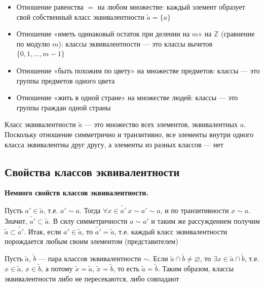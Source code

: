 \documentclass[a4paper,12pt]{article}
\theoremstyle{definition}
\theoremstyle{plain}
\theoremstyle{remark}
\begin{document}
	\begin{tcolorbox}[colback=gray!5, colframe=gray!50, title=Примеры отношений эквивалентности]
		\begin{itemize}
			\item Отношение равенства $=$ на любом множестве: каждый элемент образует свой собственный класс эквивалентности $\widetilde{a} = \{a\}$
			\item Отношение «иметь одинаковый остаток при делении на $m$» на $\mathbb{Z}$ (сравнение по модулю $m$): классы эквивалентности — это классы вычетов $\{0, 1, \dots, m-1\}$
			\item Отношение «быть похожим по цвету» на множестве предметов: классы — это группы предметов одного цвета
			\item Отношение «жить в одной стране» на множестве людей: классы — это группы граждан одной страны
		\end{itemize}
	\end{tcolorbox}
	
	\begin{tcolorbox}[colback=yellow!5, colframe=orange!60!black, title=Замечание о классах]
		Класс эквивалентности $\widetilde{a}$ — это множество всех элементов, эквивалентных $a$. Поскольку отношение симметрично и транзитивно, все элементы внутри одного класса эквивалентны друг другу, а элементы из разных классов — нет
	\end{tcolorbox}
	
	\subsection{Свойства классов эквивалентности}
	
	\noindent \textbf{Немного свойств классов эквивалентности.}
	
	Пусть $a' \in \widetilde{a}$, т.е. $a' \sim a$. Тогда $\forall x \in \widetilde{a'} \ x \sim a' \sim a$, и по транзитивности $x \sim a$. Значит, $\widetilde{a'} \subset \widetilde{a}$. В силу симметричности $a \sim a'$ и таким же рассуждением получим $\widetilde{a} \subset \widetilde{a'}$. Итак, если $a' \in \widetilde{a}$, то $\widetilde{a'} = \widetilde{a}$, т.е. каждый класс эквивалентности порождается любым своим элементом (представителем)
	
	Пусть $\widetilde{a}$, $\widetilde{b}$ — пара классов эквивалентности $\sim$. Если $\widetilde{a} \cap \widetilde{b} \neq \varnothing$, то $\exists x \in \widetilde{a} \cap \widetilde{b}$, т.е. $x \in \widetilde{a}$, $x \in \widetilde{b}$, а потому $\widetilde{x} = \widetilde{a}$, $\widetilde{x} = \widetilde{b}$, то есть $\widetilde{a} = \widetilde{b}$. Таким образом, классы эквивалентности либо не пересекаются, либо совпадают
	
\end{document}
